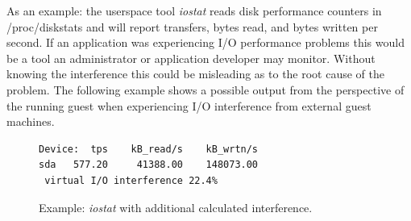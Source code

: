 \indent As an example: the userspace tool \emph{iostat} reads disk performance counters in /proc/diskstats and will report transfers, bytes read, and bytes written per second.  If an application was experiencing I/O performance problems this would be a tool an administrator or application developer may monitor.  Without knowing the interference this could be misleading as to the root cause of the problem.  The following example shows a possible output from the perspective of the running guest when experiencing I/O interference from external guest machines.

\begin{figure}[h]
\begin{Verbatim}
Device:  tps    kB_read/s    kB_wrtn/s
sda   577.20     41388.00    148073.00
 virtual I/O interference 22.4%     
\end{Verbatim}
\label{fig:iostat}
\caption{Example:  \emph{iostat} with additional calculated interference.}
\end{figure}

